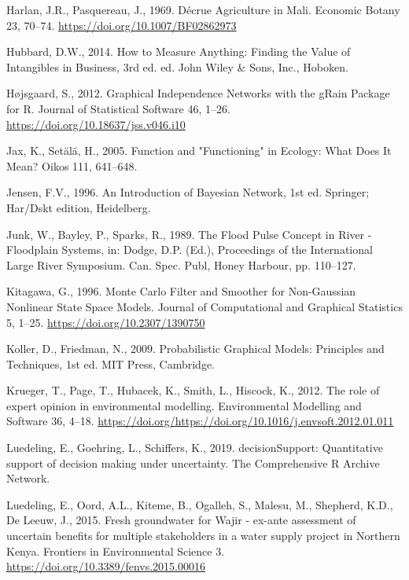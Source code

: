 \documentclass[]{elsarticle} %
\begin{document}
\leavevmode\hypertarget{ref-Harlan_and_Pasquereau_1969}{}%
Harlan, J.R., Pasquereau, J., 1969. Décrue Agriculture in Mali. Economic Botany 23, 70--74. \url{https://doi.org/10.1007/BF02862973}

\leavevmode\hypertarget{ref-Hubbard_2014}{}%
Hubbard, D.W., 2014. How to Measure Anything: Finding the Value of Intangibles in Business, 3rd ed. ed. John Wiley \& Sons, Inc., Hoboken.

\leavevmode\hypertarget{ref-Hojsgaard_2012}{}%
Højsgaard, S., 2012. Graphical Independence Networks with the gRain Package for R. Journal of Statistical Software 46, 1--26. \url{https://doi.org/10.18637/jss.v046.i10}

\leavevmode\hypertarget{ref-Jax_and_Setala_2005}{}%
Jax, K., Setälä, H., 2005. Function and "Functioning" in Ecology: What Does It Mean? Oikos 111, 641--648.

\leavevmode\hypertarget{ref-Jensen_1996}{}%
Jensen, F.V., 1996. An Introduction of Bayesian Network, 1st ed. Springer; Har/Dskt edition, Heidelberg.

\leavevmode\hypertarget{ref-Junk_et_al_1989}{}%
Junk, W., Bayley, P., Sparks, R., 1989. The Flood Pulse Concept in River - Floodplain Systems, in: Dodge, D.P. (Ed.), Proceedings of the International Large River Symposium. Can. Spec. Publ, Honey Harbour, pp. 110--127.

\leavevmode\hypertarget{ref-Kitagawa_1996}{}%
Kitagawa, G., 1996. Monte Carlo Filter and Smoother for Non-Gaussian Nonlinear State Space Models. Journal of Computational and Graphical Statistics 5, 1--25. \url{https://doi.org/10.2307/1390750}

\leavevmode\hypertarget{ref-Koller_and_Friedman_2009}{}%
Koller, D., Friedman, N., 2009. Probabilistic Graphical Models: Principles and Techniques, 1st ed. MIT Press, Cambridge.

\leavevmode\hypertarget{ref-Krueger_et_al_2012}{}%
Krueger, T., Page, T., Hubacek, K., Smith, L., Hiscock, K., 2012. The role of expert opinion in environmental modelling. Environmental Modelling and Software 36, 4--18. \url{https://doi.org/https://doi.org/10.1016/j.envsoft.2012.01.011}

\leavevmode\hypertarget{ref-Luedeling_Goehring_et_al_2019}{}%
Luedeling, E., Goehring, L., Schiffers, K., 2019. decisionSupport: Quantitative support of decision making under uncertainty. The Comprehensive R Archive Network.

\leavevmode\hypertarget{ref-Luedeling_et_al_2015}{}%
Luedeling, E., Oord, A.L., Kiteme, B., Ogalleh, S., Malesu, M., Shepherd, K.D., De Leeuw, J., 2015. Fresh groundwater for Wajir - ex-ante assessment of uncertain benefits for multiple stakeholders in a water supply project in Northern Kenya. Frontiers in Environmental Science 3. \url{https://doi.org/10.3389/fenvs.2015.00016}
\end{document}
